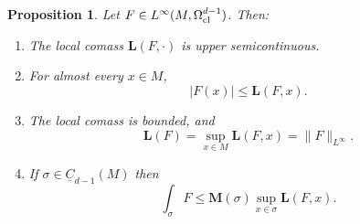\documentclass[reqno,11pt]{amsart}
\newcommand{\Chain}{\underline C}
\newcommand{\Mass}{\mathbf M}
\newcommand{\Comass}{\mathbf L}
\newtheorem{proposition}[theorem]{Proposition}
\theoremstyle{definition}
\numberwithin{equation}{section}
\begin{document}
\begin{proposition}\label{crandall}
Let $F \in L^\infty(M, \Omega^{d - 1}_{\rm cl})$. Then:
\begin{enumerate}
\item The local comass $\Comass(F, \cdot)$ is upper semicontinuous. \label{crandall usc}
\item For almost every $x \in M$, \label{crandall LDT}
$$|F(x)| \leq \Comass(F, x).$$
\item The local comass is bounded, and \label{crandall linfinity}
$$\Comass(F) = \sup_{x \in M} \Comass(F, x) = \|F\|_{L^\infty}.$$
\item If $\sigma \in \Chain_{d - 1}(M)$ then \label{crandall best curl is ABC}
$$\int_\sigma F \leq \Mass(\sigma) \sup_{x \in \sigma} \Comass(F, x).$$
\end{enumerate}
\end{proposition}
\end{document}

